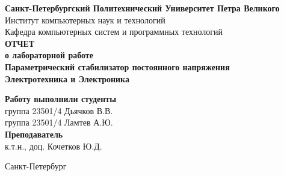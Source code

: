 \begin{titlepage}	%

	\begin{center}		%

		 \textbf{Санкт-Петербургский Политехнический Университет Петра Великого}\\[0.3cm]
		 \small Институт компьютерных наук и технологий \\[0.3cm]
		 \small Кафедра компьютерных систем и программных технологий\\[4cm]
		
		 \textbf{ОТЧЕТ}\\ \textbf{о лабораторной работе}\\[0.5cm]
		 \textbf{Параметрический стабилизатор постоянного напряжения}\\[0.1cm]
		 \textbf{Электротехника и Электроника}\\[10.5cm]

	\end{center}


	\begin{flushright} %
		\begin{minipage}{0.60\textwidth} %
			\begin{flushleft} %

				 \small \textbf{Работу выполнили студенты}\\[3mm]
				 \small группа 23501/4\hspace*{17mm}   Дьячков В.В.\\[3mm]
				 \small группа 23501/4\hspace*{17mm}   Ламтев А.Ю.\\[5mm]
				
				\small \textbf{Преподаватель}\\[5mm]
			 	\small \sign[3.5cm]   \hspace*{8mm} к.т.н., доц. Кочетков Ю.Д.\\[0.5cm]

			\end{flushleft}
		\end{minipage}
	\end{flushright}
	
	\vfill %

	\begin{center}
	\small Санкт-Петербург\\
	\small \the\year %
	\end{center} %

\thispagestyle{empty} %
\end{titlepage} %

\vfill %
